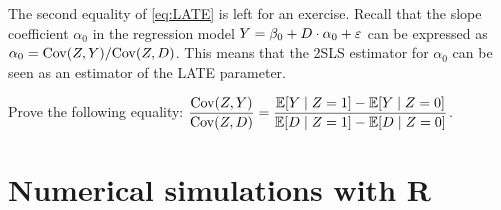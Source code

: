 \documentclass[11pt, A4paper, openany, uplatex]{book}
\begin{document}
The second equality of \eqref{eq:LATE} is left for an exercise.
Recall that the slope coefficient $\alpha_0$ in the regression model $Y = \beta_0 + D \cdot \alpha_0 + \varepsilon$ can be expressed as $\alpha_0 = \mathrm{Cov}(Z, Y)/\mathrm{Cov}(Z, D)$.
This means that the 2SLS estimator for $\alpha_0$ can be seen as an estimator of the LATE parameter.

\hrulefill
\begin{exercise}\upshape
	Prove the following equality: $\displaystyle \frac{\mathrm{Cov}(Z, Y)}{\mathrm{Cov}(Z, D)} = \frac{\mathbb{E}[Y \mid Z = 1] - \mathbb{E}[Y \mid Z = 0]}{\mathbb{E}[D \mid Z = 1] - \mathbb{E}[D \mid Z = 0]}$.
\end{exercise}

\section{Numerical simulations with \textbf{R}}
\end{document}
